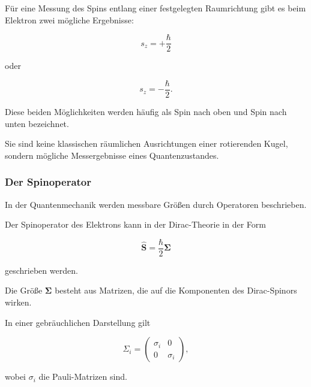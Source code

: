 \begin{PhysicsBox}
	\label{box:zwei_spinrichtungen_dirac}
	
	Für eine Messung des Spins entlang einer festgelegten Raumrichtung
	gibt es beim Elektron zwei mögliche Ergebnisse:
	
	\begin{equation}
		s_z
		=
		+\frac{\hbar}{2}
	\end{equation}
	
	oder
	
	\begin{equation}
		s_z
		=
		-\frac{\hbar}{2}.
	\end{equation}
	
	Diese beiden Möglichkeiten werden häufig als Spin nach oben und Spin
	nach unten bezeichnet.
	
	Sie sind keine klassischen räumlichen Ausrichtungen einer rotierenden
	Kugel, sondern mögliche Messergebnisse eines Quantenzustandes.
\end{PhysicsBox}

\subsubsection*{Der Spinoperator}

In der Quantenmechanik werden messbare Größen durch Operatoren
beschrieben.

Der Spinoperator des Elektrons kann in der Dirac-Theorie in der Form

\begin{equation}
	\hat{\mathbf{S}}
	=
	\frac{\hbar}{2}
	\boldsymbol{\Sigma}
	\label{eq:spinoperator_dirac}
\end{equation}

geschrieben werden.

Die Größe \(\boldsymbol{\Sigma}\) besteht aus Matrizen, die auf die
Komponenten des Dirac-Spinors wirken.

In einer gebräuchlichen Darstellung gilt

\begin{equation}
	\Sigma_i
	=
	\begin{pmatrix}
		\sigma_i & 0 \\
		0 & \sigma_i
	\end{pmatrix},
	\label{eq:sigma_dirac_spinoperator}
\end{equation}

wobei \(\sigma_i\) die Pauli-Matrizen%
 sind.

